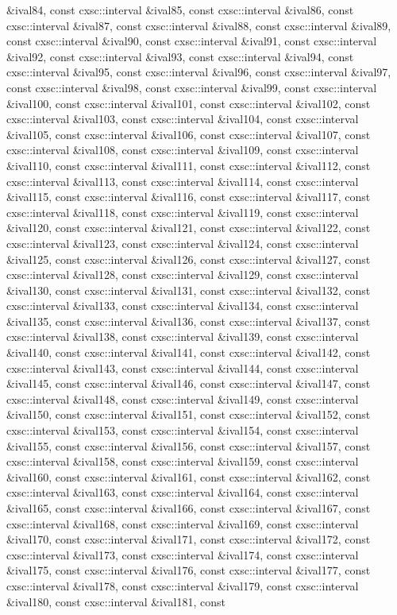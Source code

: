 \begin{DoxyCompactItemize}
\&ival84, const cxsc\-::interval \&ival85, const cxsc\-::interval \&ival86, const cxsc\-::interval \&ival87, const cxsc\-::interval \&ival88, const cxsc\-::interval \&ival89, const cxsc\-::interval \&ival90, const cxsc\-::interval \&ival91, const cxsc\-::interval \&ival92, const cxsc\-::interval \&ival93, const cxsc\-::interval \&ival94, const cxsc\-::interval \&ival95, const cxsc\-::interval \&ival96, const cxsc\-::interval \&ival97, const cxsc\-::interval \&ival98, const cxsc\-::interval \&ival99, const cxsc\-::interval \&ival100, const cxsc\-::interval \&ival101, const cxsc\-::interval \&ival102, const cxsc\-::interval \&ival103, const cxsc\-::interval \&ival104, const cxsc\-::interval \&ival105, const cxsc\-::interval \&ival106, const cxsc\-::interval \&ival107, const cxsc\-::interval \&ival108, const cxsc\-::interval \&ival109, const cxsc\-::interval \&ival110, const cxsc\-::interval \&ival111, const cxsc\-::interval \&ival112, const cxsc\-::interval \&ival113, const cxsc\-::interval \&ival114, const cxsc\-::interval \&ival115, const cxsc\-::interval \&ival116, const cxsc\-::interval \&ival117, const cxsc\-::interval \&ival118, const cxsc\-::interval \&ival119, const cxsc\-::interval \&ival120, const cxsc\-::interval \&ival121, const cxsc\-::interval \&ival122, const cxsc\-::interval \&ival123, const cxsc\-::interval \&ival124, const cxsc\-::interval \&ival125, const cxsc\-::interval \&ival126, const cxsc\-::interval \&ival127, const cxsc\-::interval \&ival128, const cxsc\-::interval \&ival129, const cxsc\-::interval \&ival130, const cxsc\-::interval \&ival131, const cxsc\-::interval \&ival132, const cxsc\-::interval \&ival133, const cxsc\-::interval \&ival134, const cxsc\-::interval \&ival135, const cxsc\-::interval \&ival136, const cxsc\-::interval \&ival137, const cxsc\-::interval \&ival138, const cxsc\-::interval \&ival139, const cxsc\-::interval \&ival140, const cxsc\-::interval \&ival141, const cxsc\-::interval \&ival142, const cxsc\-::interval \&ival143, const cxsc\-::interval \&ival144, const cxsc\-::interval \&ival145, const cxsc\-::interval \&ival146, const cxsc\-::interval \&ival147, const cxsc\-::interval \&ival148, const cxsc\-::interval \&ival149, const cxsc\-::interval \&ival150, const cxsc\-::interval \&ival151, const cxsc\-::interval \&ival152, const cxsc\-::interval \&ival153, const cxsc\-::interval \&ival154, const cxsc\-::interval \&ival155, const cxsc\-::interval \&ival156, const cxsc\-::interval \&ival157, const cxsc\-::interval \&ival158, const cxsc\-::interval \&ival159, const cxsc\-::interval \&ival160, const cxsc\-::interval \&ival161, const cxsc\-::interval \&ival162, const cxsc\-::interval \&ival163, const cxsc\-::interval \&ival164, const cxsc\-::interval \&ival165, const cxsc\-::interval \&ival166, const cxsc\-::interval \&ival167, const cxsc\-::interval \&ival168, const cxsc\-::interval \&ival169, const cxsc\-::interval \&ival170, const cxsc\-::interval \&ival171, const cxsc\-::interval \&ival172, const cxsc\-::interval \&ival173, const cxsc\-::interval \&ival174, const cxsc\-::interval \&ival175, const cxsc\-::interval \&ival176, const cxsc\-::interval \&ival177, const cxsc\-::interval \&ival178, const cxsc\-::interval \&ival179, const cxsc\-::interval \&ival180, const cxsc\-::interval \&ival181, const 
\end{DoxyCompactItemize}

